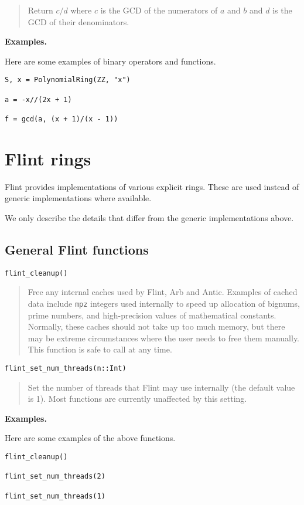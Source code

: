 \documentclass[a4paper,10pt]{article}
\newcommand{\code}{\lstinline}
\newcommand{\desc}[1]{\vspace{-3mm}\begin{quote}#1\end{quote}}
\begin{document}
\desc{Return $c/d$ where $c$ is the GCD of the numerators of $a$ and $b$ and
$d$ is the GCD of their denominators.}

\textbf{Examples.}

Here are some examples of binary operators and functions.

\begin{lstlisting}
S, x = PolynomialRing(ZZ, "x")

a = -x//(2x + 1)

f = gcd(a, (x + 1)/(x - 1))
\end{lstlisting}

\section{Flint rings}

Flint provides implementations of various explicit rings. These are used instead of generic
implementations where available.

We only describe the details that differ from the generic implementations above.

\subsection{General Flint functions}

\begin{lstlisting}
flint_cleanup()
\end{lstlisting}

\desc{Free any internal caches used by Flint, Arb and Antic.
Examples of cached data include \code{mpz} integers used internally
to speed up allocation of bignums,
prime numbers, and high-precision values of mathematical constants.
Normally, these caches should not take up too much memory, but there may
be extreme circumstances where the user needs to free them manually.
This function is safe to call at any time.}

\begin{lstlisting}
flint_set_num_threads(n::Int)
\end{lstlisting}

\desc{Set the number of threads that Flint may use internally (the default
value is 1). Most functions are currently unaffected by this setting.}

\textbf{Examples.}

Here are some examples of the above functions.

\begin{lstlisting}
flint_cleanup()

flint_set_num_threads(2)

flint_set_num_threads(1)
\end{lstlisting}
\end{document}

